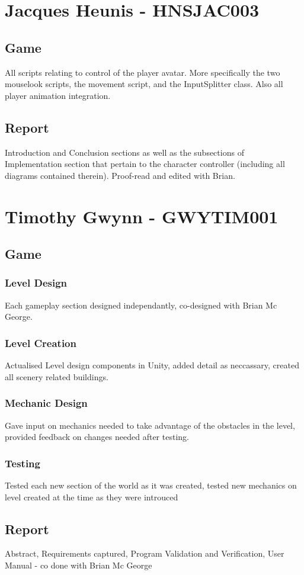 \documentclass[11pt,a4paper]{article}
\begin{document}
\section{Jacques Heunis - HNSJAC003}
\subsection{Game}
All scripts relating to control of the player avatar. More specifically the two mouselook scripts, the movement script, and the InputSplitter class. Also all player animation integration. \\
\subsection{Report}
Introduction and Conclusion sections as well as the subsections of Implementation section that pertain to the character controller (including all diagrams contained therein). Proof-read and edited with Brian.
\section{Timothy Gwynn - GWYTIM001}
\subsection{Game}
\subsubsection{Level Design}
Each gameplay section designed independantly, co-designed with Brian Mc George.
\subsubsection{Level Creation}
Actualised Level design components in Unity, added detail as neccassary, created all scenery related buildings.
\subsubsection{Mechanic Design}
Gave input on mechanics needed to take advantage of the obstacles in the level, provided feedback on changes needed after testing.
\subsubsection{Testing}
Tested each new section of the world as it was created, tested new mechanics on level created at the time as they were introuced
\subsection{Report}
Abstract, Requirements captured, Program Validation and Verification, User Manual - co done with Brian Mc George
\end{document}
